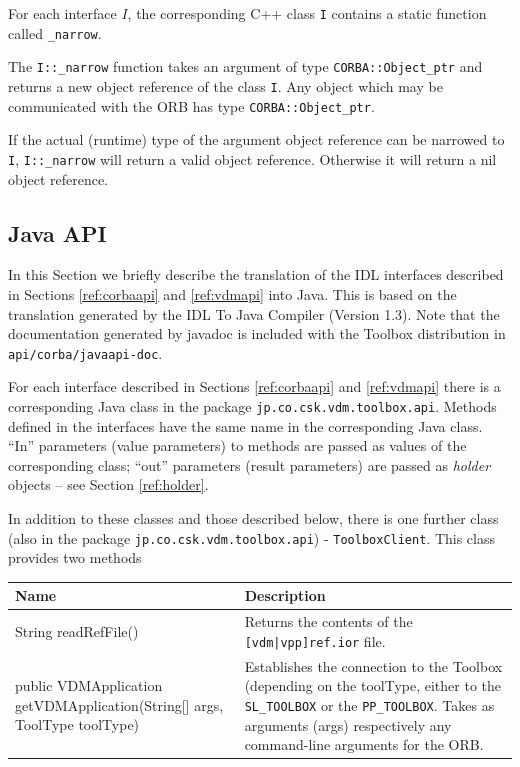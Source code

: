 \documentclass[\pformat,12pt]{article}
\newcommand{\pbs}[1]{\let\temp=\\#1\let\\=\temp}
\newenvironment{interfacetable}{%
  \begin{longtable}{|>{\pbs\raggedright\ttfamily}p{6.6cm}%
                    |>{\pbs\raggedright}p{6.6cm}|} \hline
  \textrm{\bfseries Name} &  \textbf{Description} \\ \hline
  \endhead
  }{\end{longtable}}
\begin{document}
For each interface $I$, the corresponding C++ class \texttt{I}
contains a static function called \texttt{\_narrow}. 

The \texttt{I::\_narrow} function takes an argument of type
\texttt{CORBA::Object\_ptr} and returns a new object reference of the
class \texttt{I}. Any object which may be communicated with the ORB
has type \texttt{CORBA::Object\_ptr}.

If the actual (runtime) type of the argument object
reference can be narrowed to \texttt{I}, \texttt{I::\_narrow} will
return a valid  object reference. Otherwise it will return a nil
object reference. 



\subsection{Java API}

In this Section we briefly describe the translation of the IDL
interfaces described in Sections \ref{ref:corbaapi} and
\ref{ref:vdmapi} into Java. This is based on the translation generated
by the IDL To Java Compiler (Version 1.3). Note that the documentation
generated by javadoc is included with the Toolbox distribution in
\texttt{api/corba/javaapi-doc}. 

For each interface described in Sections \ref{ref:corbaapi} and
\ref{ref:vdmapi} there is a corresponding Java class in the package 
\texttt{jp.co.csk.vdm.toolbox.api}. Methods defined in the interfaces have
the same name in the corresponding Java class. ``In'' parameters
(value parameters) to methods are passed as values of the
corresponding class; ``out'' parameters (result parameters) are passed
as \textit{holder} objects -- see Section \ref{ref:holder}. 


In addition to these classes and those described below, there is one
further class (also in the package \texttt{jp.co.csk.vdm.toolbox.api}) -
\texttt{ToolboxClient}. This class provides two methods

\begin{interfacetable}
String readRefFile()
& Returns the contents of the \texttt{[vdm|vpp]ref.ior} file.\\ \hline
%
public VDMApplication getVDMApplication(String[] args, ToolType toolType)
& Establishes the connection to the Toolbox (depending on the
  toolType, either to the {\tt SL\_TOOLBOX} or the {\tt PP\_TOOLBOX}.
  Takes as arguments (args)
  respectively any command-line arguments for the ORB. \\ \hline
\end{interfacetable}
\end{document}
